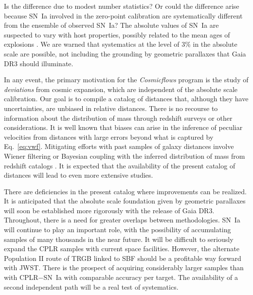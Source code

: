 \documentclass[twocolumn]{aastex63}
\begin{document}
Is the difference due to modest number statistics?  Or could the difference arise because SN~Ia involved in the zero-point calibration are systematically different from the ensemble of observed SN~Ia?  The absolute values of SN~Ia are suspected to vary with host properties, possibly related to the mean ages of explosions \citep{2013ApJ...764..191H, 2013ApJ...770..108C, 2018A&A...615A..68R}.  We are warned that systematics at the level of 3\% in the absolute scale are possible, not including the grounding by geometric parallaxes that Gaia DR3 should illuminate.   

In any event, the primary motivation for the {\it Cosmicflows} program is the study of {\it deviations} from cosmic expansion, which are independent of the absolute scale calibration.  Our goal is to compile a catalog of distances that, although they have uncertainties, are unbiased in relative distances.  There is no recourse to information about the distribution of mass through redshift surveys or other considerations.  It is well known that biases can arise in the inference of peculiar velocities from distances with large errors beyond what is captured by Eq.~\ref{eq:vwf}.  Mitigating efforts with past samples of galaxy distances involve Wiener filtering or Bayesian coupling with the inferred distribution of mass from redshift catalogs \citep{2012ApJ...744...43C, 2015MNRAS.449.4494H, 2021MNRAS.505.3380H, 2015MNRAS.450..317C, 2019A&A...625A..64J, 2019MNRAS.488.5438G, 2021MNRAS.507.1557L}.  It is expected that the availability of the present catalog of distances will lead to even more extensive studies.

There are deficiencies in the present catalog where improvements can be realized.  It is anticipated that the absolute scale foundation given by geometric parallaxes will soon be established more rigorously with the release of Gaia DR3.  Throughout, there is a need for greater overlaps between methodologies.  SN~Ia will continue to play an important role, with the possibility of accumulating samples of many thousands in the near future.  It will be difficult to seriously expand the CPLR samples with current space facilities.  However, the alternate Population II route of TRGB linked to SBF should be a profitable way forward with JWST.  There is the prospect of acquiring considerably larger samples than with CPLR$-$SN~Ia with comparable accuracy per target.  The availability of a second independent path will be a real test of systematics.

\end{document}
